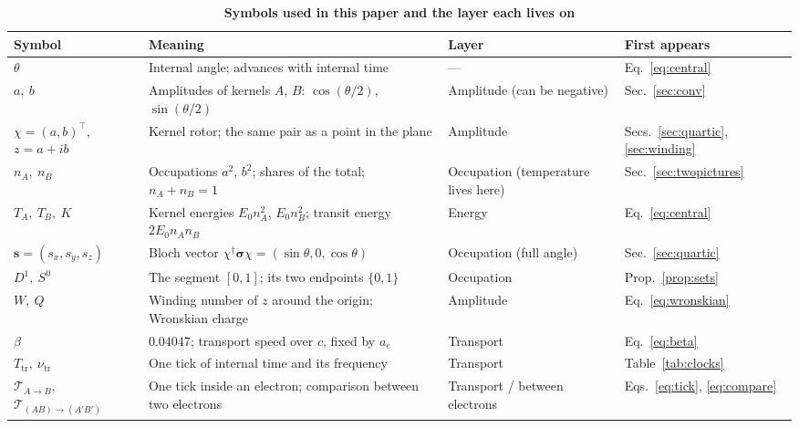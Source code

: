 \documentclass[%
 reprint, amsmath,amssymb, aps, prb, ]{revtex4-2}
\numberwithin{equation}{section}
\newcommand{\Bloch}{\mathbf{s}}
\begin{document}
\begin{table}[t!]
\centering
\caption{\textbf{Symbols used in this paper and the layer each lives on}}
\label{tab:symbols}
\renewcommand{\arraystretch}{1.4}
\begin{tabular}{p{2.6cm}p{5.4cm}p{3.4cm}p{4.0cm}}
\toprule
\textbf{Symbol} & \textbf{Meaning} & \textbf{Layer} & \textbf{First appears} \\
\midrule
$\theta$
& Internal angle; advances with internal time
& ---
& Eq.~\eqref{eq:central} \\
\addlinespace[0.3cm]
$a,\ b$
& Amplitudes of kernels $A$, $B$: $\cos(\theta/2)$, $\sin(\theta/2)$
& Amplitude (can be negative)
& Sec.~\ref{sec:conv} \\
\addlinespace[0.3cm]
$\chi=(a,b)^\top$, $z=a+ib$
& Kernel rotor; the same pair as a point in the plane
& Amplitude
& Secs.~\ref{sec:quartic}, \ref{sec:winding} \\
\addlinespace[0.3cm]
$n_A,\ n_B$
& Occupations $a^2$, $b^2$; shares of the total; $n_A+n_B=1$
& Occupation (temperature lives here)
& Sec.~\ref{sec:twopictures} \\
\addlinespace[0.3cm]
$T_A,\ T_B,\ K$
& Kernel energies $E_0n_A^2$, $E_0n_B^2$; transit energy $2E_0n_An_B$
& Energy
& Eq.~\eqref{eq:central} \\
\addlinespace[0.3cm]
$\Bloch=(s_x,s_y,s_z)$
& Bloch vector $\chi^\dagger\bm{\sigma}\chi=(\sin\theta,0,\cos\theta)$
& Occupation (full angle)
& Sec.~\ref{sec:quartic} \\
\addlinespace[0.3cm]
$D^1,\ S^0$
& The segment $[0,1]$; its two endpoints $\{0,1\}$
& Occupation
& Prop.~\ref{prop:sets} \\
\addlinespace[0.3cm]
$W,\ Q$
& Winding number of $z$ around the origin; Wronskian charge
& Amplitude
& Eq.~\eqref{eq:wronskian} \\
\addlinespace[0.3cm]
$\beta$
& $0.04047$; transport speed over $c$, fixed by $a_e$
& Transport
& Eq.~\eqref{eq:beta} \\
\addlinespace[0.3cm]
$T_{\mathrm{tr}},\ \nu_{\mathrm{tr}}$
& One tick of internal time and its frequency
& Transport
& Table~\ref{tab:clocks} \\
\addlinespace[0.3cm]
$\mathcal{T}_{A\to B}$, $\mathcal{T}_{(AB)\to(A'B')}$
& One tick inside an electron; comparison between two electrons
& Transport / between electrons
& Eqs.~\eqref{eq:tick}, \eqref{eq:compare} \\

\end{tabular}
\end{table}
\end{document}
